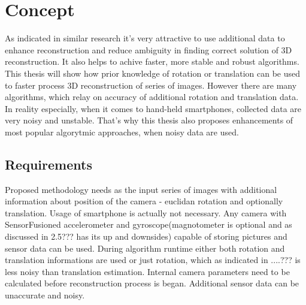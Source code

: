 
\chapter{Concept} %
As indicated in similar research it's very attractive to use additional data to enhance reconstruction and reduce ambiguity in finding correct solution of 3D reconstruction. It also helps to achive faster, more stable and robust algorithms. This thesis will show how prior knowledge of rotation or translation can be used to faster process 3D reconstruction of series of images. 
However there are many algorithms, which relay on accuracy of additional rotation and translation data. In reality especially, when it comes to hand-held smartphones, collected data are very noisy and unstable. That's why this thesis also proposes enhancements of most popular algorytmic approaches, when noisy data are used.

\section{Requirements}
Proposed methodology needs as the input series of images with additional information about position of the camera - euclidan rotation and optionally translation. Usage of smartphone is actually not necessary. Any camera with SensorFusioned accelerometer and gyroscope(magnotometer is optional and as discussed in 2.5??? has its up and downsides) capable of storing pictures and sensor data can be used. During algorithm runtime either both rotation and translation informations are used or just rotation, which as indicated in ....??? is less noisy than translation estimation. Internal camera parameters need to be calculated before reconstruction process is began. Additional sensor data can be unaccurate and noisy.
